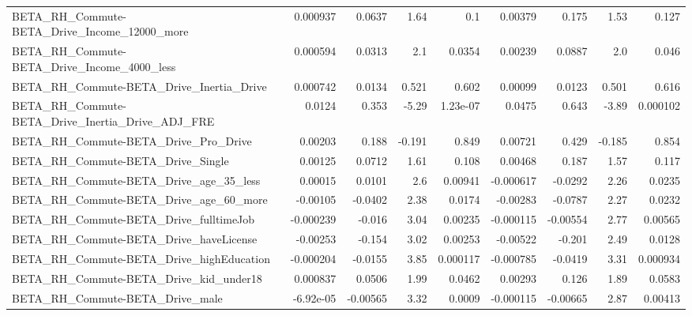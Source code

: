 \begin{tabular}{lrrrrrrrr}
BETA\_RH\_Commute-BETA\_Drive\_Income\_12000\_more       &    0.000937 &       0.0637 &     1.64 &      0.1 &    0.00379 &       0.175 &         1.53 &         0.127 \\
BETA\_RH\_Commute-BETA\_Drive\_Income\_4000\_less        &    0.000594 &       0.0313 &      2.1 &   0.0354 &    0.00239 &      0.0887 &          2.0 &         0.046 \\
BETA\_RH\_Commute-BETA\_Drive\_Inertia\_Drive           &    0.000742 &       0.0134 &    0.521 &    0.602 &    0.00099 &      0.0123 &        0.501 &         0.616 \\
BETA\_RH\_Commute-BETA\_Drive\_Inertia\_Drive\_ADJ\_FRE   &      0.0124 &        0.353 &    -5.29 & 1.23e-07 &     0.0475 &       0.643 &        -3.89 &      0.000102 \\
BETA\_RH\_Commute-BETA\_Drive\_Pro\_Drive               &     0.00203 &        0.188 &   -0.191 &    0.849 &    0.00721 &       0.429 &       -0.185 &         0.854 \\
BETA\_RH\_Commute-BETA\_Drive\_Single                  &     0.00125 &       0.0712 &     1.61 &    0.108 &    0.00468 &       0.187 &         1.57 &         0.117 \\
BETA\_RH\_Commute-BETA\_Drive\_age\_35\_less             &     0.00015 &       0.0101 &      2.6 &  0.00941 &  -0.000617 &     -0.0292 &         2.26 &        0.0235 \\
BETA\_RH\_Commute-BETA\_Drive\_age\_60\_more             &    -0.00105 &      -0.0402 &     2.38 &   0.0174 &   -0.00283 &     -0.0787 &         2.27 &        0.0232 \\
BETA\_RH\_Commute-BETA\_Drive\_fulltimeJob             &   -0.000239 &       -0.016 &     3.04 &  0.00235 &  -0.000115 &    -0.00554 &         2.77 &       0.00565 \\
BETA\_RH\_Commute-BETA\_Drive\_haveLicense             &    -0.00253 &       -0.154 &     3.02 &  0.00253 &   -0.00522 &      -0.201 &         2.49 &        0.0128 \\
BETA\_RH\_Commute-BETA\_Drive\_highEducation           &   -0.000204 &      -0.0155 &     3.85 & 0.000117 &  -0.000785 &     -0.0419 &         3.31 &      0.000934 \\
BETA\_RH\_Commute-BETA\_Drive\_kid\_under18             &    0.000837 &       0.0506 &     1.99 &   0.0462 &    0.00293 &       0.126 &         1.89 &        0.0583 \\
BETA\_RH\_Commute-BETA\_Drive\_male                    &   -6.92e-05 &     -0.00565 &     3.32 &   0.0009 &  -0.000115 &    -0.00665 &         2.87 &       0.00413 \\

\end{tabular}
